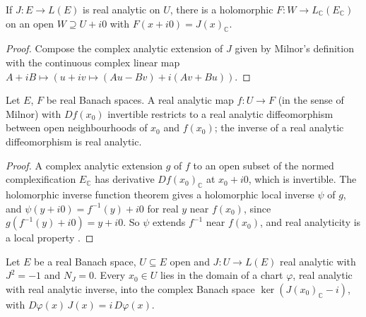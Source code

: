 \begin{lemma}
  \label{lem:holomorphic-extension-clm}
  \leanok
  If $J \colon E \to L(E)$ is real analytic on $U$, there is a holomorphic
  $F \colon W \to L_{\mathbb{C}}(E_{\mathbb{C}})$ on an open $W \supseteq U + i0$ with
  $F(x + i0) = J(x)_{\mathbb{C}}$.
\end{lemma}

\begin{proof}
  \leanok
  Compose the complex analytic extension of $J$ given by Milnor's definition with the continuous
  complex linear map $A + iB \mapsto (u + iv \mapsto (Au - Bv) + i(Av + Bu))$.
\end{proof}

\begin{theorem}
  \label{thm:real-analytic-inverse}
  \leanok
  Let $E$, $F$ be real Banach spaces. A real analytic map $f \colon U \to F$ (in the sense of
  Milnor) with $Df(x_0)$ invertible restricts to a real analytic diffeomorphism between open
  neighbourhoods of $x_0$ and $f(x_0)$; the inverse of a real analytic diffeomorphism is real
  analytic.
\end{theorem}

\begin{proof}
  \leanok
  A complex analytic extension $g$ of $f$ to an open subset of the normed complexification
  $E_{\mathbb{C}}$ has derivative $Df(x_0)_{\mathbb{C}}$ at $x_0 + i0$, which is invertible. The
  holomorphic inverse function theorem gives a holomorphic local inverse $\psi$ of $g$, and
  $\psi(y + i0) = f^{-1}(y) + i0$ for real $y$ near $f(x_0)$, since
  $g(f^{-1}(y) + i0) = y + i0$. So $\psi$ extends $f^{-1}$ near $f(x_0)$, and real analyticity is
  a local property \cite[Lemma~2.2.3]{GN26}.
\end{proof}

\begin{theorem}
  \label{thm:newlander-nirenberg}
  \leanok
  Let $E$ be a real Banach space, $U \subseteq E$ open and $J \colon U \to L(E)$ real analytic
  with $J^2 = -1$ and $N_J = 0$. Every $x_0 \in U$ lies in the domain of a chart $\varphi$, real
  analytic with real analytic inverse, into the complex Banach space $\ker(J(x_0)_{\mathbb{C}} - i)$, with
  $D\varphi(x)\,J(x) = i\,D\varphi(x)$.
\end{theorem}

